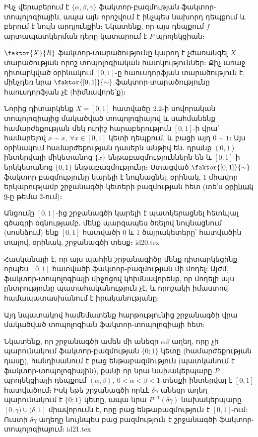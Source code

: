 \documentclass[./main.tex]{subfiles}
\begin{document}
\begin{example}
\par Ինչ վերաբերում է $\{\alpha,\beta,\gamma\}$ ֆակտոր-բազմության ֆակտոր-տոպոլոգիային, ապա այն որոշվում է ինչպես նախորդ դեպքում և բերում է նույն արդյունքին։ Նկատենք, որ այս դեպքում $f$ արտապատկերման դերը կատարում է $P$ պրոյեկցիան։

\begin{note} 
$\faktor{X}{R}$ ֆակտոր-տարածությունը կարող է չժառանգել $X$ տա\-րա\-ծու\-թյան որոշ տոպոլոգիական հատկություններ։ Քիչ առաջ դիտարկված օրինակում $[0,1]$-ը հաուս\-դոր\-ֆյան տարածություն է, մինչդեռ նրա $\faktor{[0,1]}{\sim}$ ֆակտոր-տարածու\-թյունը հաուս\-դորֆ\-յան չէ (հիմնավորե՛ք)։
\end{note}
\end{example}

\begin{example}\label{ch12ex2}
Նորից դիտարկենք $X=[0,1]$ հատվածը $2.2$-ի սովորական տո\-պո\-լո\-գիա\-յից մակածված տոպոլոգիայով և սահմանենք համարժեքության մեկ ուրիշ հա\-րա\-բե\-րու\-թյուն $[0, 1]$-ի վրա՝ համարելով $x\sim x,\ \forall x\in[0,1]$ կետի դեպքում, և բացի այդ $0\sim 1$։ Այս օրինակում համարժեքության դասերն անթիվ են․ դրանք $(0,1)$ ինտերվալի միկետանոց $\{x\}$ ենթաբազմություններն են և $[0,1]$-ի երկ\-կե\-տա\-նոց $\{0,1\}$ ենթաբազմությունը։ Ստացված $\faktor{[0,1]}{\sim}$ ֆակտոր-բազմությունը կարելի է նույ\-նացնել, օրինակ, 1 միավոր երկարությամբ շրջանագծի կետերի բազմության հետ (տե՛ս \hyperref[ch2ex9]{օրինակ 9}-ը թեմա 2-ում)։

\par Անցումը $[0, 1]$-ից շրջանագծի կարելի է պատկերացնել հետևյալ գծագրի օգ\-նու\-թյամբ․ մենք պարզապես ծռելով նույնացնում (սոսնձում) ենք $[0, 1]$ հատվածի $0$ և $1$ ծայրակետերը՝ հատվածին տալով, օրինակ, շրջանագծի տեսք։ 
{id20.tex}

\par Հասկանալի է, որ այս պահին շրջանագիծը մենք դիտարկեցինք որպես $[0, 1]$ հատվածի ֆակտոր-բազմության մի մոդել։ Այժմ, ֆակտոր-տոպոլոգիայի միջոցով կհիմնա\-վո\-րենք, որ մո\-դելի այս ընտ\-րու\-թյունը պատահականություն չէ, և որոշակի իմաս\-տով հա\-մա\-պա\-տաս\-խանում է իրականությանը:

\par Այդ նպատակով համեմատենք հարթությունից շրջանագծի վրա մակածված տո\-պո\-լոգիան ֆակտոր-տոպոլոգիայի հետ:

\par Նկատենք, որ շրջանագծի ամեն մի անեզր $\alpha\beta$ աղեղ, որը չի պարունակում ֆակ\-տոր-բազմության $\{0; 1\}$ կետը (համարժեքության դասը), հանդիսանում է բաց ենթաբազմություն (պատկանում է ֆակտոր-տոպոլոգիային), քանի որ նրա նա\-խա\-կեր\-պարը $P$ պրո\-յեկ\-ցիա\-յի դեպքում $(\alpha,\beta),\ {0<\alpha<\beta<1}$ տեսքի ինտերվալ է $[0, 1]$ հատվածում։ Իսկ եթե շրջանագծի որևէ $\delta\gamma$ անեզր աղեղ պարունա\-կում է $\{0; 1\}$ կետը, ապա նրա $P^{-1} (\delta\gamma)$ նախակերպարը $[0,\gamma)\cup(\delta,1]$ միավորումն է, որը բաց ենթաբազմություն է $[0, 1]\textrm{-ում}$։ Ուստի $\delta\gamma$ աղեղը նույնպես բաց բազմություն է շրջա\-նա\-գծի ֆակտոր-տոպոլոգիայում։ 
{id21.tex}


\end{example}
\end{document}
